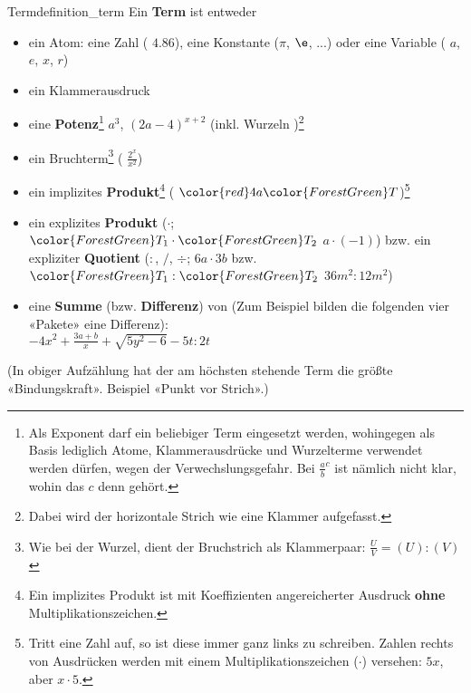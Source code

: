 \begin{definition}{Term}{definition_term}
  Ein \textbf{Term} ist entweder
  \begin{itemize}
  \item ein Atom: eine Zahl (\zB{} $4.86$), eine Konstante
    ($\pi$, $\e$, ...) oder  eine Variable (\zB{}   $a$, $e$, $x$, $r$)
  \item ein Klammerausdruck  
   \item eine \textbf{Potenz}\footnote{Als Exponent darf
     ein beliebiger Term eingesetzt werden, wohingegen als Basis
     lediglich Atome, Klammerausdrücke und Wurzelterme verwendet
     werden dürfen, wegen der Verwechslungsgefahr. Bei
     ${\frac{a}{b}}^c$ ist nämlich nicht klar, wohin das $c$ denn
     gehört.}
      \zB{}
     $a^3$, $(2a - 4)^{x+2}$ (inkl.  Wurzeln )\footnote{Dabei wird der
  horizontale Strich wie eine Klammer aufgefasst.}
    \item  ein Bruchterm\footnote{Wie bei der Wurzel, dient der Bruchstrich als Klammerpaar: $\frac{U}{V}=(U):(V)$} ( \zB{} $\frac{2^x}{x^2}$)
    \item ein implizites \textbf{Produkt}\footnote{Ein implizites
      Produkt ist mit Koeffizienten angereicherter Ausdruck
      \textbf{ohne} Multiplikationszeichen.} (\zB{}
      ${\color{red}4a}{\color{ForestGreen}T}$)\footnote{Tritt eine Zahl auf,
      so ist diese immer ganz links zu schreiben. Zahlen rechts von
      Ausdrücken werden mit einem Multiplikationszeichen ($\cdot$) versehen: $5x$, aber $x\cdot{}5$.}
    \item ein explizites \textbf{Produkt} ($\cdot$;  ${\color{ForestGreen}T_1}\cdot {\color{ForestGreen}T_2}$ \zB{} $a\cdot(-1)$) bzw. ein expliziter \textbf{Quotient} ($:$, $/$, $\div$; $6a\cdot3b$ bzw. ${\color{ForestGreen}T_1}:{\color{ForestGreen}T_2}$ \zB{} $36m^2:12m^2$)
  \item eine \textbf{Summe} (bzw. \textbf{Differenz}) von 
  (Zum Beispiel bilden die folgenden
  vier «Pakete» eine Differenz):\\
  $-4x^2 + \frac{3a+b}{x} + \sqrt{5y^2-6} - 5t:2t$

    \end{itemize}
(In obiger Aufzählung hat der am höchsten stehende Term die größte
«Bindungskraft». Beispiel «Punkt vor Strich».)
\end{definition}

